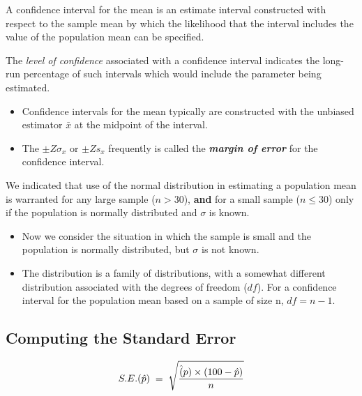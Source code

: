\documentclass[]{report}
\begin{document}

A confidence interval for the
mean is an estimate interval constructed with respect to the sample mean by which the likelihood that the interval
includes the value of the population mean can be specified.

The \emph{level of confidence} associated with a confidence interval indicates the long-run percentage
of such intervals which would include the parameter being estimated.


\begin{itemize}
\item Confidence intervals for the mean typically are constructed with the unbiased estimator $\bar{x}$ at the midpoint
of the interval.

\item The $\pm Z \sigma_x$ or $\pm Z s_x$ frequently is called the \textbf{\emph{margin of error}} for the confidence interval.
\end{itemize}


We indicated that use of the normal distribution in estimating a population mean is warranted
for any large sample ($n > 30$), \textbf{and} for a small sample ($n \leq 30$) only if the population is normally distributed
and $\sigma$ is known.


\begin{itemize}
\item Now we consider the situation in which the sample is small and the population is normally distributed,
but $\sigma$ is not known.
\item The distribution is a family of distributions, with
a somewhat different distribution associated with the degrees of freedom ($df$). For a confidence interval for the
population mean based on a sample of size n, $df = n - 1$.
\end{itemize}


{

\subsection{Computing the Standard Error}

\[
S.E. (\hat{p}) \;=\; \sqrt{ {\hat(p) \times (100 -\hat{p} )\over n}}
\]



}
\end{document}
